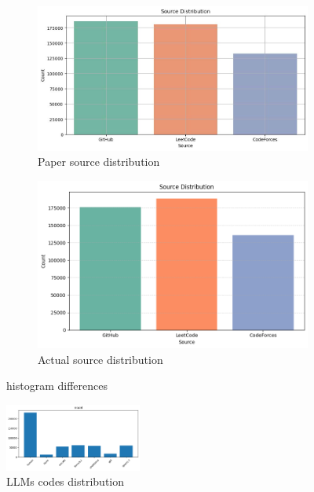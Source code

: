 \begin{figure}[h]
    \centering
    \begin{subfigure}[b]{0.45\textwidth}
        \centering
        \includegraphics[width=\linewidth]{img/CoDet-M4/origianl_histogram_source_distribution.jpeg}
        \caption{Paper source distribution}
        \label{fig:immagine1}
    \end{subfigure}
    \hfill
    \begin{subfigure}[b]{0.45\textwidth}
        \centering
        \includegraphics[width=\linewidth]{img/CoDet-M4/histogram_source_distribution_MY.png}
        \caption{Actual source distribution}
        \label{fig:immagine2}
    \end{subfigure}
    \caption{histogram differences}
    \label{fig:CoDet-M4_histogram_differences}
\end{figure}





\begin{figure}[H]
    \centering
    \includegraphics[width=0.4\textwidth]{img/CoDet-M4/models.png}
    \caption{LLMs codes distribution}
    \label{fig:LLMs_codes}
\end{figure}

